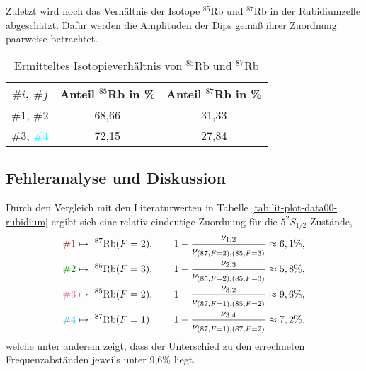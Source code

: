 \noindent Zuletzt wird noch das Verhältnis der Isotope $^{85}$Rb und $^{87}$Rb in der Rubidiumzelle abgeschätzt. Dafür werden die Amplituden der Dips gemäß ihrer Zuordnung paarweise betrachtet.

\begin{table}[!h]
    \centering
    \begin{tabular}{|c|c|c|}
        \hline
        $\#i$, $\#j$    &       Anteil $^{85}$Rb in \%      &       Anteil $^{87}$Rb in \%  \\
        \hline
        \hline
         \textcolor{red!80!black}{\#1}, \textcolor{green!50!black}{\#2}     &       68,66       &       31,33       \\
        \hline
         \textcolor{pink!50!purple}{\#3}, \textcolor{cyan}{\#4}             &       72,15       &       27,84       \\
        \hline
    \end{tabular}
    \caption{Ermitteltes Isotopieverhältnis von $^{85}$Rb und $^{87}$Rb}
    \label{tab:isotopy-ratio}
\end{table}


\subsection{Fehleranalyse und Diskussion}
\label{subsec:absorption-error-analysis-and-discussion}

Durch den Vergleich mit den Literaturwerten in Tabelle \ref{tab:lit-plot-data00-rubidium} ergibt sich eine relativ eindeutige Zuordnung für die $5^{2}S_{1/2}$-Zustände, 
\begin{align*}
    \textcolor{red!80!black}{\#1} &\mapsto \ ^{87}\text{Rb}(F = 2), \qquad 1 - \frac{\nu_{1,2}}{\nu_{(87, F = 2),(85, F = 3)}} \approx 6,1 \%,  \\ \textcolor{green!50!black}{\#2} &\mapsto \ ^{85}\text{Rb}(F = 3), \qquad 1 - \frac{\nu_{2,3}}{\nu_{(85, F = 2),(85, F = 3)}} \approx 5,8 \%, \\
    \textcolor{pink!50!purple}{\#3} &\mapsto \ ^{85}\text{Rb}(F = 2), \qquad 1 - \frac{\nu_{3,2}}{\nu_{(87, F = 1),(85, F = 2)}} \approx 9,6 \%, \\
    \textcolor{cyan}{\#4} &\mapsto \ ^{87}\text{Rb}(F = 1), \qquad 1 - \frac{\nu_{3,4}}{\nu_{(87, F = 1),(87, F = 2)}} \approx 7,2 \%,
\end{align*}
welche unter anderem zeigt, dass der Unterschied zu den errechneten Frequenzabständen jeweils unter 9,6\% liegt. \\

